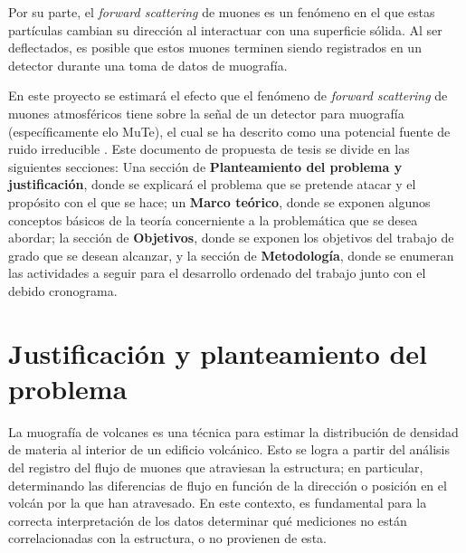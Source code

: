 \documentclass[12pt]{report}
\begin{document}
Por su parte, el \textit{forward scattering} de muones es un fenómeno en el que estas partículas cambian su dirección al interactuar con una superficie sólida. Al ser deflectados, es posible que estos muones terminen siendo registrados en un detector durante una toma de datos de muografía.

En este proyecto se estimará el efecto que el fenómeno de \textit{forward scattering} de muones atmosféricos tiene sobre la señal de un detector para muografía (específicamente elo MuTe), el cual se ha descrito como una potencial fuente de ruido irreducible \cite{gomez2017forward}. Este documento de propuesta de tesis se divide en las siguientes secciones: Una sección de \textbf{Planteamiento del problema y justificación}, donde se explicará el problema que se pretende atacar y el propósito con el que se hace; un \textbf{Marco teórico}, donde se exponen algunos conceptos básicos de la teoría concerniente a la problemática que se desea abordar; la sección de \textbf{Objetivos}, donde se exponen los objetivos del trabajo de grado que se desean alcanzar, y la sección de \textbf{Metodología}, donde se enumeran las actividades a seguir para el desarrollo ordenado del trabajo junto con el debido cronograma.


\section*{Justificación y planteamiento del problema}

La muografía de volcanes es una técnica para estimar la distribución de densidad de materia al interior de un edificio volcánico. Esto se logra a partir del análisis del registro del flujo de muones que atraviesan la estructura; en particular, determinando las diferencias de flujo en función de la dirección o posición en el volcán por la que han atravesado. En este contexto, es fundamental para la correcta interpretación de los datos determinar qué mediciones no están correlacionadas con la estructura, o no provienen de esta.
\end{document}
